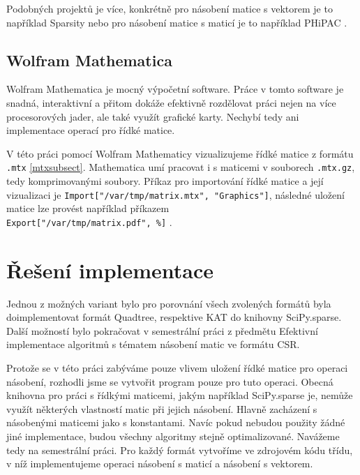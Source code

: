 Podobných projektů je více, konkrétně pro násobení matice s vektorem je to například Sparsity \cite{sparsity} nebo pro násobení matice s maticí je to například PHiPAC \cite{PHiPAC}\cite{bilmes96a}.

\subsection{Wolfram Mathematica}

Wolfram Mathematica \cite{mathematica} je mocný výpočetní software. Práce v tomto software je snadná, interaktivní a přitom dokáže efektivně rozdělovat práci nejen na více procesorových jader, ale také využít grafické karty. Nechybí tedy ani implementace operací pro řídké matice.

V této práci pomocí Wolfram Mathematicy vizualizujeme řídké matice z formátu \texttt{.mtx} \ref{mtxsubsect}. Mathematica umí pracovat i s maticemi v souborech \texttt{.mtx.gz}, tedy komprimovanými soubory. Příkaz pro importování řídké matice a její vizualizaci je \texttt{Import["/var/tmp/matrix.mtx", "Graphics"]}, následné uložení matice lze provést například příkazem \\ \texttt{Export["/var/tmp/matrix.pdf", \%]} \cite{mathematicaMTX}.

\section{Řešení implementace}

Jednou z možných variant bylo pro porovnání všech zvolených formátů byla doimplementovat formát Quadtree, respektive KAT do knihovny SciPy.sparse. Další možností bylo pokračovat v semestrální práci z předmětu Efektivní implementace algoritmů s tématem násobení matic ve formátu CSR.

Protože se v této práci zabýváme pouze vlivem uložení řídké matice pro operaci násobení, rozhodli jsme se vytvořit program pouze pro tuto operaci. Obecná knihovna pro práci s řídkými maticemi, jakým například SciPy.sparse je, nemůže využít některých vlastností matic při jejich násobení. Hlavně zacházení s násobenými maticemi jako s konstantami. Navíc pokud nebudou použity žádné jiné implementace, budou všechny algoritmy stejně optimalizované. Navážeme tedy na semestrální práci. Pro každý formát vytvoříme ve zdrojovém kódu třídu, v níž implementujeme operaci násobení s maticí a násobení s vektorem.
